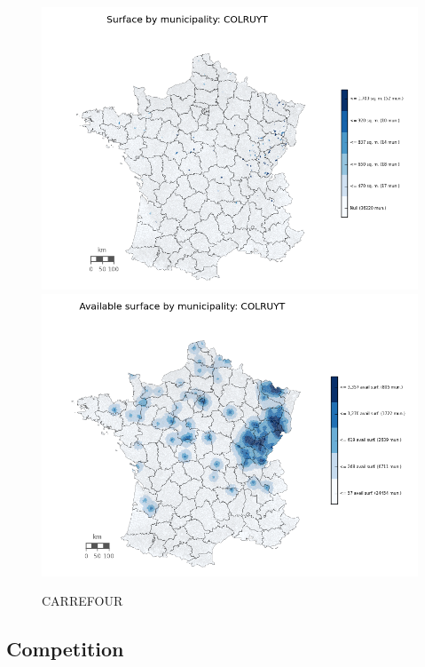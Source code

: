 \documentclass[11pt]{article}
\begin{document}
\begin{figure}[H]
    \caption{CARREFOUR}
	\centering
		\includegraphics[width=15cm]{images/maps_surface/COLRUYT.png}
        \includegraphics[width=15cm]{images/maps_available_surface/COLRUYT.png}
\end{figure}

\subsection{Competition}
\end{document}
